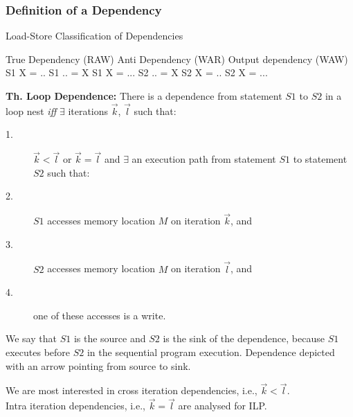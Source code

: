 \documentclass{beamer}
\newcommand{\emp}[1]{\textcolor{DikuRed}{ #1}}
\begin{document}
\begin{frame}[fragile,t]
  \frametitle{Definition of a Dependency} %
\vspace{-2ex}
\begin{block}{Load-Store Classification of Dependencies}
\begin{colorcode}
True Dependency (RAW)    Anti Dependency (WAR)    Output dependency (WAW)
S1    X  = ..            S1    .. = X             S1    X = ...            
S2    .. = X             S2    X  = ..            S2    X = ...
\end{colorcode}
\end{block} 

\smallskip

{\bf Th. Loop Dependence:} There is a dependence from statement $S1$ to $S2$
in a loop nest {\em iff} $\exists$ iterations $\vec{k}$, $\vec{l}$ such that:\pause
\begin{description}
    \item[1.] $\vec{k} < \vec{l}$ or $\vec{k} = \vec{l}$ and $\exists$ 
                an execution path from statement $S1$ to statement $S2$ \emp{such that:}
    \item[2.] $S1$ accesses memory location $M$ on iteration $\vec{k}$, and
    \item[3.] $S2$ accesses memory location $M$ on iteration $\vec{l}$, and
    \item[4.] one of these accesses is a write.
\end{description}
\medskip

\emp{We say that $S1$ is the source and $S2$ is the sink of the dependence}, 
because $S1$ executes before $S2$ in the sequential program execution.
Dependence depicted with an arrow pointing from source to sink.\pause

\medskip
We are most interested in cross iteration dependencies, i.e., $\vec{k} < \vec{l}$.\\\smallskip
Intra iteration dependencies, i.e., $\vec{k} = \vec{l}$ are analysed for ILP. 

\end{frame}
\end{document}
